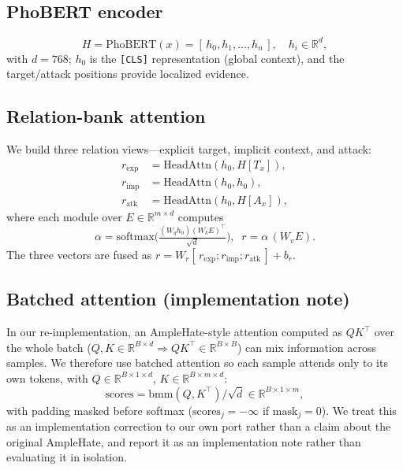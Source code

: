 \documentclass[11pt]{article}
\begin{document}
\subsection{PhoBERT encoder}
\begin{equation}
  H = \mathrm{PhoBERT}(x) = [\,h_0, h_1, \dots, h_n\,], \quad h_i \in \mathbb{R}^{d},
\end{equation}
with $d=768$; $h_0$ is the \texttt{[CLS]} representation (global context), and the target/attack positions provide localized evidence.

\subsection{Relation-bank attention}
We build three relation views---explicit target, implicit context, and attack:
\begin{align}
  r_{\mathrm{exp}} &= \mathrm{HeadAttn}(h_0, H[T_x]), \nonumber\\
  r_{\mathrm{imp}} &= \mathrm{HeadAttn}(h_0, h_0), \\
  r_{\mathrm{atk}} &= \mathrm{HeadAttn}(h_0, H[A_x]), \nonumber
\end{align}
where each module over $E \in \mathbb{R}^{m\times d}$ computes
\begin{equation}
  \alpha = \mathrm{softmax}\!\Big(\tfrac{(W_q h_0)(W_k E)^\top}{\sqrt d}\Big),\;\; r = \alpha\,(W_v E).
\end{equation}
The three vectors are fused as $r = W_r[\,r_{\mathrm{exp}};r_{\mathrm{imp}};r_{\mathrm{atk}}\,] + b_r$.

\subsection{Batched attention (implementation note)}
In our re-implementation, an AmpleHate-style attention computed as $QK^\top$ over the whole batch ($Q,K\in\mathbb{R}^{B\times d}\Rightarrow QK^\top\in\mathbb{R}^{B\times B}$) can mix information across samples. We therefore use batched attention so each sample attends only to its own tokens, with $Q\in\mathbb{R}^{B\times 1\times d}$, $K\in\mathbb{R}^{B\times m\times d}$:
\begin{equation}
  \mathrm{scores} = \mathrm{bmm}(Q,K^\top)/\sqrt d \in\mathbb{R}^{B\times1\times m},
\end{equation}
with padding masked before softmax ($\mathrm{scores}_j=-\infty$ if $\mathrm{mask}_j=0$). We treat this as an implementation correction to our own port rather than a claim about the original AmpleHate, and report it as an implementation note rather than evaluating it in isolation.
\end{document}
